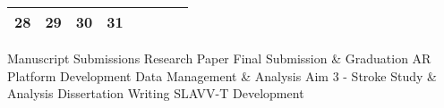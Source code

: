 {\begin{tabularx}{\linewidth}{|l!{\vrule width \myLenLineThicknessThick}*{7}{@{}X@{}|}}
      
      
        \begin{minipage}[t]{6mm}\centering{}28\end{minipage}
      
       & 
    
      
      
        \begin{minipage}[t]{6mm}\centering{}29\end{minipage}
      
       & 
    
      
      
        \begin{minipage}[t]{6mm}\centering{}30\end{minipage}
      
       & 
    
      
      
        \begin{minipage}[t]{6mm}\centering{}31\end{minipage}
      
       & 
    
      
      
       & 
    
      
      
       & 
    
      
      
      
        \\  \hline 
      
    
  
  
  \end{tabularx}
}
\vfill{\centering{} \small{Manuscript Submissions}\hspace{ 1.5em } \small{Research Paper}\hspace{ 1.5em } \small{Final Submission \& Graduation}\hspace{ 1.5em } \small{AR Platform Development}\hspace{ 1.5em } \small{Data Management \& Analysis}\hspace{ 1.5em } \small{Aim 3 - Stroke Study \& Analysis}\hspace{ 1.5em } \small{Dissertation Writing}\hspace{ 1.5em } \small{SLAVV-T Development}\hspace{ 1.5em }\par}

